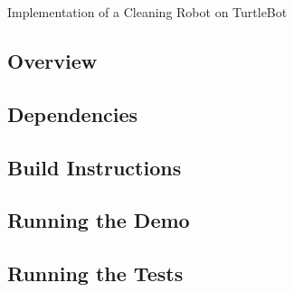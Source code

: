 Implementation of a Cleaning Robot on Turtle\+Bot  \href{https://travis-ci.org/VBot2410/vacuum_bot}{\tt } \href{https://opensource.org/licenses/MIT}{\tt }

\subsection*{Overview}

\subsection*{Dependencies}

\subsection*{Build Instructions}

\subsection*{Running the Demo}

\subsection*{Running the Tests}
